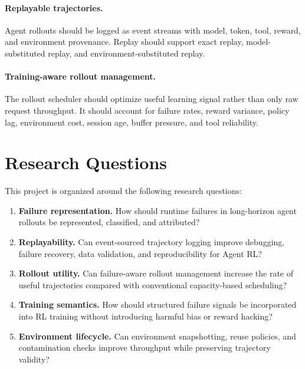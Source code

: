 \documentclass[11pt]{article}
\begin{document}
\paragraph{Replayable trajectories.}
Agent rollouts should be logged as event streams with model, token, tool, reward, and environment provenance.
Replay should support exact replay, model-substituted replay, and environment-substituted replay.

\paragraph{Training-aware rollout management.}
The rollout scheduler should optimize useful learning signal rather than only raw request throughput.
It should account for failure rates, reward variance, policy lag, environment cost, session age, buffer pressure, and tool reliability.

\section{Research Questions}

This project is organized around the following research questions:

\begin{enumerate}[leftmargin=*]
    \item \textbf{Failure representation.}
    How should runtime failures in long-horizon agent rollouts be represented, classified, and attributed?

    \item \textbf{Replayability.}
    Can event-sourced trajectory logging improve debugging, failure recovery, data validation, and reproducibility for Agent RL?

    \item \textbf{Rollout utility.}
    Can failure-aware rollout management increase the rate of useful trajectories compared with conventional capacity-based scheduling?

    \item \textbf{Training semantics.}
    How should structured failure signals be incorporated into RL training without introducing harmful bias or reward hacking?

    \item \textbf{Environment lifecycle.}
    Can environment snapshotting, reuse policies, and contamination checks improve throughput while preserving trajectory validity?
\end{enumerate}
\end{document}

